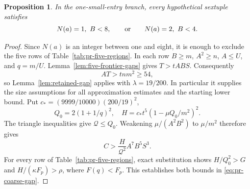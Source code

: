 \documentclass[12pt]{article}
\newtheorem{proposition}[theorem]{Proposition}
\numberwithin{equation}{section}
\begin{document}
\begin{proposition}\label{prop:pr-H2}
In the one-small-entry branch, every hypothetical sextuple satisfies
\[
 N(a)=1,\ B<8,\qquad\hbox{or}\qquad N(a)=2,\ B<4.
\]
\end{proposition}
\begin{proof}
Since \(N(a)\) is an integer between one and eight, it is enough to
exclude the five rows of Table~\ref{tab:pr-five-regions}. In each row
\(B\ge m\), \(A^2\ge n\), \(A\le U\), and \(q=m/U\).
Lemma~\ref{lem:five-frontier-gaps} gives \(T>tABS\).
Consequently
\[
 AT>tnm^2\ge54,
\]
so Lemma~\ref{lem:retained-gap} applies with \(\lambda=19/200\).
In particular it supplies the size assumptions for all approximation
estimates and the starting lower bound. Put \(c_*=(9999/10000)(200/19)^2\),
\[
 Q_0=2(1+1/q)^2,\quad
 H=c_*t^5(1-\mu Q_0/m^2)^2.
\]
The triangle inequalities give \(\mathcal Q\le Q_0\).
Weakening \(\mu/(A^2B^2)\) to \(\mu/m^2\) therefore gives
\[
 C>\frac{H}{\mathcal Q^2}A^7B^5S^3.
\]
For every row of Table~\ref{tab:pr-five-regions}, exact substitution
shows \(H/Q_0^2>G\) and \(H/(\kappa F_p)>\rho\), where
\(F(q)<F_p\). This establishes both bounds in
\eqref{eq:pr-coarse-gap}.


\end{proof}
\end{document}
